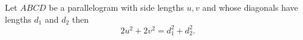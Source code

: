 \documentclass[12pt]{article}
\begin{document}
Let $ABCD$ be a parallelogram with side lengths $u,v$ and whose diagonals have lengths $d_1$ and $d_2$ then
$$2u^2+2v^2=d_1^2 + d_2^2.$$


\begin{center}
\end{center}
\end{document}
